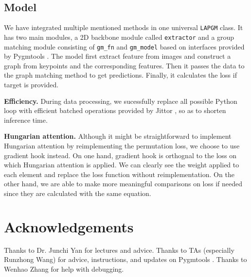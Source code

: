 \documentclass[a4paper]{article}
\begin{document}
\subsection{Model}
We have integrated multiple mentioned methods in one universal \texttt{LAPGM} class. It has two main modules, a 2D backbone module called \texttt{extractor} and a group matching module consisting of \texttt{gm\_fn} and \texttt{gm\_model} based on interfaces provided by Pygmtools \cite{pygmtools}. The model first extract feature from images and construct a graph from keypoints and the corresponding features. Then it passes the data to the graph matching method to get predictions. Finally, it calculates the loss if target is provided.

\textbf{Efficiency.}
During data processing, we sucessfully replace all possible Python loop with efficient batched operations provided by Jittor \cite{jittor}, so as to shorten inference time.

\textbf{Hungarian attention.}
Although it might be straightforward to implement Hungarian attention by reimplementing the permutation loss, we choose to use gradient hook instead. On one hand, gradient hook is orthognal to the loss on which Hungarian attention is applied. We can clearly see the weight applied to each element and replace the loss function without reimplementation. On the other hand, we are able to make more meaningful comparisons on loss if needed since they are calculated with the same equation.

\section{Acknowledgements}
Thanks to Dr. Junchi Yan for lectures and advice. Thanks to TAs (especially Runzhong Wang) for advice, instructions, and updates on Pygmtools \cite{pygmtools}. Thanks to Wenhao Zhang for help with debugging.

\newpage 


\end{document}
